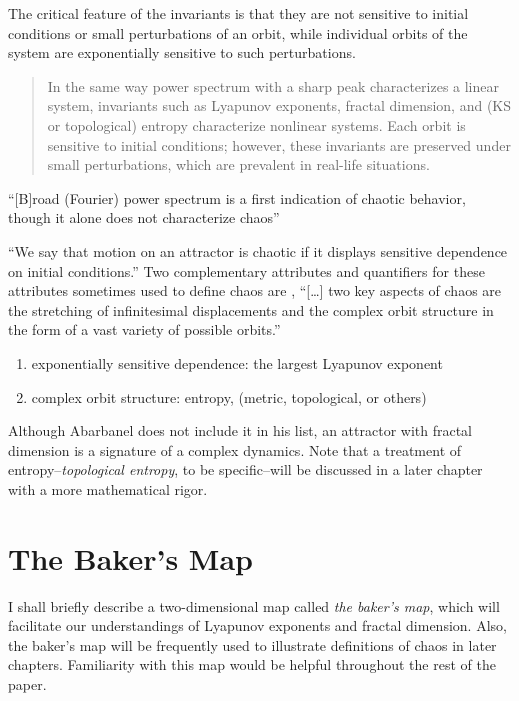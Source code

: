 \documentclass[11pt]{book}
\begin{document}
The critical feature of the invariants is that they are not sensitive to initial conditions
or small perturbations of an orbit, while individual orbits of the system are exponentially
sensitive to such perturbations. \citep[p.1334]{abarbanel}

\begin{quote}
In the same way power spectrum with a sharp peak characterizes a linear system, invariants such as Lyapunov exponents, fractal dimension, and (KS or topological) entropy characterize nonlinear systems.
Each orbit is sensitive to initial conditions; however, these invariants are preserved under small perturbations, which are prevalent in real-life situations.
\end{quote}

``[B]road (Fourier) power spectrum is a first indication of chaotic behavior, though it alone does not characterize chaos''\citep[p.1338]{abarbanel}

``We say that motion on an attractor is chaotic if it displays sensitive dependence on initial conditions.'' \citep[p.11]{ott1994}
Two complementary attributes and quantifiers for these attributes sometimes used to define chaos are \citep[p.379]{abarbanel}, %
``[\ldots] two key aspects of chaos are the stretching of infinitesimal displacements and the complex orbit structure in the form of a vast variety of possible orbits.'' \citep[p.31]{ott1994}
\begin{enumerate}
  \item exponentially sensitive dependence: the largest Lyapunov exponent 
  \item complex orbit structure: entropy, (metric, topological, or others)
\end{enumerate}

Although Abarbanel does not include it in his list, an attractor with fractal dimension is a signature of a complex dynamics.
Note that a treatment of entropy--\textit{topological entropy}, to be specific--will be discussed in a later chapter with a more mathematical rigor.

\section{The Baker's Map}
I shall briefly describe a two-dimensional map called \textit{the baker's map}, which will facilitate our understandings of Lyapunov exponents and fractal dimension.
Also, the baker's map will be frequently used to illustrate definitions of chaos in later chapters.
Familiarity with this map would be helpful throughout the rest of the paper.
\end{document}

